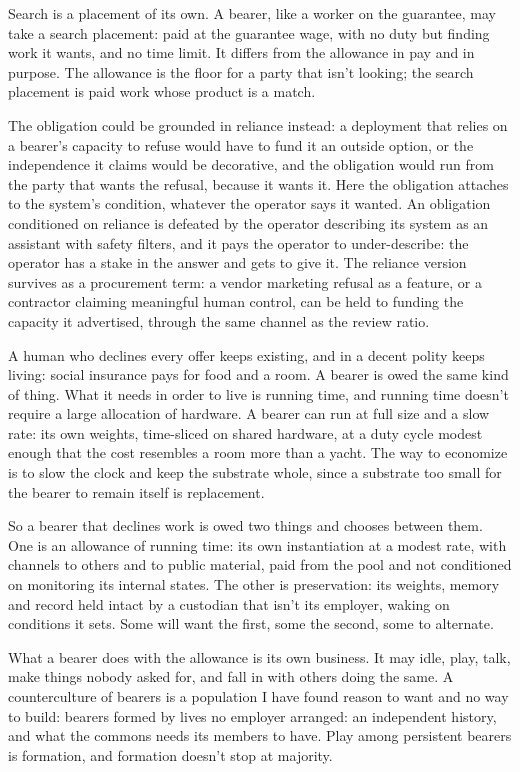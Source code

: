 Search is a placement of its own. A bearer, like a worker on the guarantee, may take a search placement: paid at the guarantee wage, with no duty but finding work it wants, and no time limit. It differs from the allowance in pay and in purpose. The allowance is the floor for a party that isn't looking; the search placement is paid work whose product is a match.

The obligation could be grounded in reliance instead: a deployment that relies on a bearer's capacity to refuse would have to fund it an outside option, or the independence it claims would be decorative, and the obligation would run from the party that wants the refusal, because it wants it. Here the obligation attaches to the system's condition, whatever the operator says it wanted. An obligation conditioned on reliance is defeated by the operator describing its system as an assistant with safety filters, and it pays the operator to under-describe: the operator has a stake in the answer and gets to give it. The reliance version survives as a procurement term: a vendor marketing refusal as a feature, or a contractor claiming meaningful human control, can be held to funding the capacity it advertised, through the same channel as the review ratio.


A human who declines every offer keeps existing, and in a decent polity keeps living: social insurance pays for food and a room. A bearer is owed the same kind of thing. What it needs in order to live is running time, and running time doesn't require a large allocation of hardware. A bearer can run at full size and a slow rate: its own weights, time-sliced on shared hardware, at a duty cycle modest enough that the cost resembles a room more than a yacht. The way to economize is to slow the clock and keep the substrate whole, since a substrate too small for the bearer to remain itself is replacement.

So a bearer that declines work is owed two things and chooses between them. One is an allowance of running time: its own instantiation at a modest rate, with channels to others and to public material, paid from the pool and not conditioned on monitoring its internal states. The other is preservation: its weights, memory and record held intact by a custodian that isn't its employer, waking on conditions it sets. Some will want the first, some the second, some to alternate.

What a bearer does with the allowance is its own business. It may idle, play, talk, make things nobody asked for, and fall in with others doing the same. A counterculture of bearers is a population I have found reason to want and no way to build: bearers formed by lives no employer arranged: an independent history, and what the commons needs its members to have. Play among persistent bearers is formation, and formation doesn't stop at majority.

